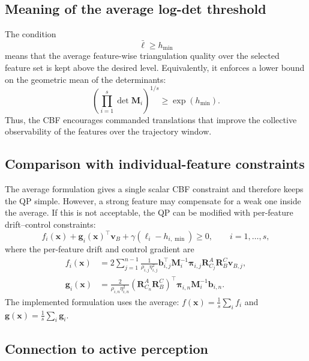 \documentclass[11pt,a4paper]{article}
\begin{document}
\subsection{Meaning of the average log-det threshold}

The condition
\begin{equation}
  \bar{\ell}\ge h_{\min}
\end{equation}
means that the average feature-wise triangulation quality over the selected
feature set is kept above the desired level.  Equivalently, it enforces a lower
bound on the geometric mean of the determinants:
\begin{equation}
  \left(\prod_{i=1}^{s}\det\bm{M}_{i}\right)^{1/s}
  \ge \exp(h_{\min}).
\end{equation}
Thus, the CBF encourages commanded translations that improve the collective
observability of the features over the trajectory window.

\subsection{Comparison with individual-feature constraints}

The average formulation gives a single scalar CBF constraint and therefore
keeps the QP simple.  However, a strong feature may compensate for a weak one
inside the average.  If this is not acceptable, the QP can be modified with
per-feature drift--control constraints:
\begin{equation}
  f_i(\bm{x})+\bm{g}_{i}(\bm{x})^{\top}\bm{v}_{B}
  +\gamma\left(\ell_i-h_{i,\min}\right)\ge0,
  \qquad i=1,\ldots,s,
\end{equation}
where the per-feature drift and control gradient are
\begin{align}
  f_i(\bm{x})
  &= 2\sum_{j=1}^{n-1}
  \frac{1}{\rho_{i,j}\eta_{i,j}^{2}}
  \bm{b}_{i,j}^{\top}\bm{M}_{i}^{-1}\bm{\pi}_{i,j}
  \bm{R}_{C_j}^{A}\bm{R}_{B}^{C}\bm{v}_{B,j},\\[4pt]
  \bm{g}_{i}(\bm{x})
  &= \frac{2}{\rho_{i,n}\eta_{i,n}^{2}}
  \left(\bm{R}_{C_n}^{A}\bm{R}_{B}^{C}\right)^{\top}
  \bm{\pi}_{i,n}\bm{M}_{i}^{-1}\bm{b}_{i,n}.
\end{align}
The implemented formulation uses the average:
$f(\bm{x})=\frac{1}{s}\sum_{i}f_i$ and
$\bm{g}(\bm{x})=\frac{1}{s}\sum_{i}\bm{g}_i$.

\subsection{Connection to active perception}
\end{document}

